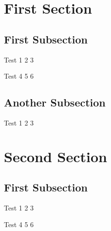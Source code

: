 \documentclass{gsbbeamer}
\date{\today}
\begin{document}
\mytitlepage

\section{\white First Section}
\subsection{First Subsection}
\begin{myframe}
\begin{myitems}
	\item Test 1 2 3
	\item Test 4 5 6
\end{myitems}
\end{myframe}

\subsection{Another Subsection}
\begin{myframe}
\begin{myitems}
	\item Test 1 2 3
 \end{myitems}
 \end{myframe}

\section{\white Second Section}
\subsection{First Subsection}
\begin{myframe}
\begin{myitems}
	\item Test 1 2 3
	\item Test 4 5 6
\end{myitems}
\end{myframe}
\end{document}
